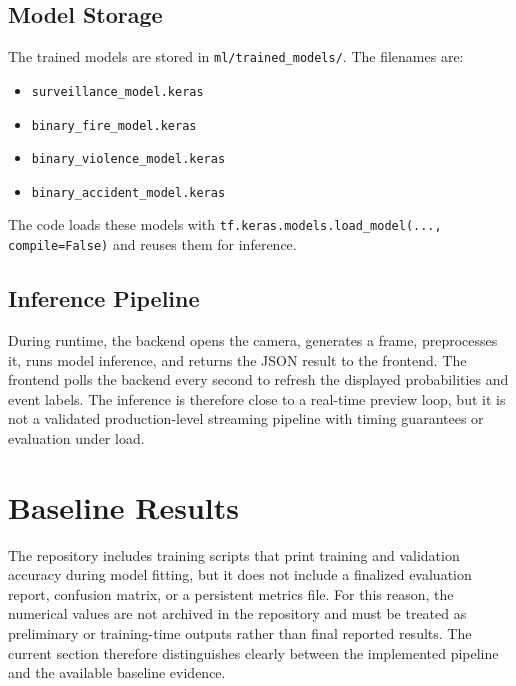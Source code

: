 \documentclass[11pt,a4paper]{article}
\begin{document}
\subsection{Model Storage}
The trained models are stored in \texttt{ml/trained\_models/}. The filenames are:
\begin{itemize}[leftmargin=1.5em]
    \item \texttt{surveillance\_model.keras}
    \item \texttt{binary\_fire\_model.keras}
    \item \texttt{binary\_violence\_model.keras}
    \item \texttt{binary\_accident\_model.keras}
\end{itemize}
The code loads these models with \texttt{tf.keras.models.load\_model(..., compile=False)} and reuses them for inference.

\subsection{Inference Pipeline}
During runtime, the backend opens the camera, generates a frame, preprocesses it, runs model inference, and returns the JSON result to the frontend. The frontend polls the backend every second to refresh the displayed probabilities and event labels. The inference is therefore close to a real-time preview loop, but it is not a validated production-level streaming pipeline with timing guarantees or evaluation under load.

\section{Baseline Results}
The repository includes training scripts that print training and validation accuracy during model fitting, but it does not include a finalized evaluation report, confusion matrix, or a persistent metrics file. For this reason, the numerical values are not archived in the repository and must be treated as preliminary or training-time outputs rather than final reported results. The current section therefore distinguishes clearly between the implemented pipeline and the available baseline evidence.
\end{document}
